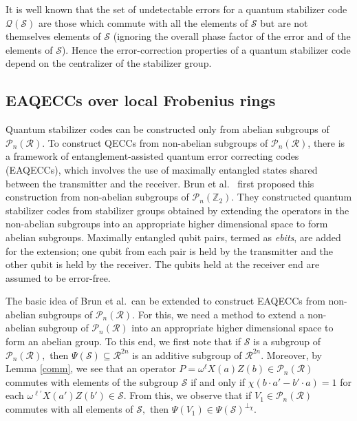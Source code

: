 \documentclass{article}
\theoremstyle{remark}
\theoremstyle{definition}
\numberwithin{equation}{section}
\begin{document}
It is well known that the set of undetectable errors for a quantum stabilizer code $\mathcal{Q}(\mathcal{S})$ are those which commute with all the elements of $\mathcal{S}$ but are not themselves elements of $\mathcal{S}$ (ignoring the overall phase factor of the error and of the elements of $\mathcal{S}$). Hence the error-correction properties of a quantum stabilizer code depend on the centralizer of the stabilizer group. 

\subsection{EAQECCs over local Frobenius rings}\label{sec:eaqecc}

Quantum stabilizer codes can be constructed only from abelian subgroups of $\mathcal{P}_n(\mathcal{R}).$  To construct QECCs from non-abelian subgroups of $\mathcal{P}_n(\mathcal{R})$, there is a framework of entanglement-assisted quantum error correcting codes (EAQECCs), which involves the use of maximally entangled states shared between the transmitter and the receiver. Brun et al.\ \cite{brun} first proposed this construction from non-abelian subgroups of $\mathcal{P}_n(\mathbb{Z}_2)$. They constructed quantum stabilizer codes from stabilizer groups obtained by extending the operators in the non-abelian subgroups into an appropriate higher dimensional space to form abelian subgroups. Maximally entangled qubit pairs, termed as \emph{ebits}, are added for the extension; one qubit from each pair is held by the transmitter and the other qubit is held by the receiver. The qubits held at the receiver end are assumed to be error-free.

The basic idea of Brun et al.\ can be extended to construct EAQECCs from non-abelian subgroups of $\mathcal{P}_n(\mathcal{R}).$ For this, we need a method to extend a non-abelian subgroup of $\mathcal{P}_n(\mathcal{R})$ into an appropriate higher dimensional space to form an abelian group.  To this end, we first note that if $\mathcal{S}$ is a subgroup of $\mathcal{P}_n(\mathcal{R}),$ then $\Psi(\mathcal{S}) \subseteq \mathcal{R}^{2n}$ is an additive subgroup of $\mathcal{R}^{2n}.$ Moreover, by Lemma \ref{comm}, we see that an operator $P=\omega^\ell X(a)Z(b) \in \mathcal{P}_n(\mathcal{R})$ commutes with elements of the subgroup $\mathcal{S}$ if and only if $\chi(b \cdot a'-b' \cdot a)=1$ for each $\omega^{\ell'}X(a')Z(b')\in \mathcal{S}.$ From this, we observe that if $V_1 \in \mathcal{P}_n(\mathcal{R})$ commutes with all elements of $\mathcal{S},$ then $\Psi(V_1) \in \Psi (\mathcal{S})^{\perp_\chi}.$ 
\end{document}
